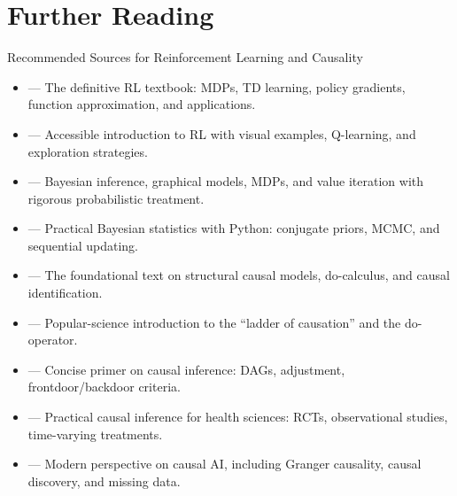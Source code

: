

    \section{Further Reading}

\begin{v3topic}{Recommended Sources for Reinforcement Learning and Causality}
    \begin{itemize}
        \item {} --- The definitive RL textbook: MDPs, TD learning, policy gradients, function approximation, and applications.
        \item {} --- Accessible introduction to RL with visual examples, Q-learning, and exploration strategies.
        \item {} --- Bayesian inference, graphical models, MDPs, and value iteration with rigorous probabilistic treatment.
        \item {} --- Practical Bayesian statistics with Python: conjugate priors, MCMC, and sequential updating.
        \item {} --- The foundational text on structural causal models, do-calculus, and causal identification.
        \item {} --- Popular-science introduction to the ``ladder of causation'' and the do-operator.
        \item {} --- Concise primer on causal inference: DAGs, adjustment, frontdoor/backdoor criteria.
        \item {} --- Practical causal inference for health sciences: RCTs, observational studies, time-varying treatments.
        \item {} --- Modern perspective on causal AI, including Granger causality, causal discovery, and missing data.
    \end{itemize}

\end{v3topic}

%